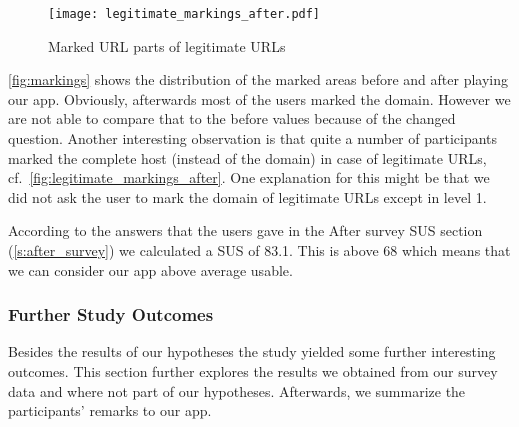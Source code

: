 \begin{description}[leftmargin=0cm]
\begin{figure}
\centering
\texttt{[image: legitimate\_markings\_after.pdf]}
\caption{Marked URL parts of legitimate URLs}
\label{fig:legitimate_markings_after}
\end{figure}
\autoref{fig:markings} shows the distribution of the marked areas before and after playing our app. Obviously, afterwards most of the users marked the domain. However we are not able to compare that to the before values because of the changed question.
Another interesting observation is that quite a number of participants marked the complete host (instead of the domain) in case of legitimate URLs, cf.~\autoref{fig:legitimate_markings_after}. One explanation for this might be that we did not ask the user to mark the domain of legitimate URLs except in level 1.
\item[Hypothesis 4:]
According to the answers that the users gave in the After survey SUS section (\autoref{s:after_survey}) we calculated a SUS of 83.1. This is above 68 which means that we can consider our app above average usable.
\end{description}

\subsubsection{Further Study Outcomes}
\label{s:further_exploration}
Besides the results of our hypotheses the study yielded some further interesting outcomes.
This section further explores the results we obtained from our survey data and where not part of our hypotheses.
Afterwards, we summarize the participants' remarks to our app.

